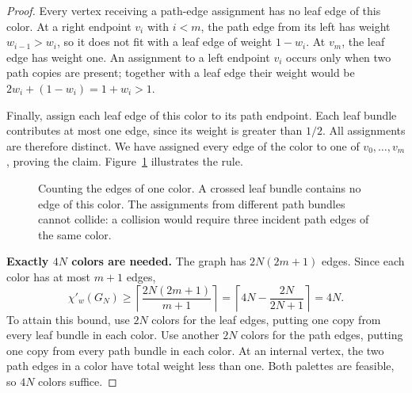 \documentclass[11pt]{article}
\theoremstyle{definition}\newtheorem{algorithm}{Algorithm}[section]
\numberwithin{equation}{section}
\theoremstyle{remark}\newtheorem*{remark}{Remark}
\begin{document}
\begin{proof}
Every vertex receiving a path-edge assignment has no leaf edge of this
color. At a right endpoint $v_i$ with $i<m$, the path edge from its
left has weight $w_{i-1}>w_i$, so it does not fit with a leaf edge of
weight $1-w_i$. At $v_m$, the leaf edge has weight one. An assignment
to a left endpoint $v_i$ occurs only when two path copies are present;
together with a leaf edge their weight would be
$2w_i+(1-w_i)=1+w_i>1$.

Finally, assign each leaf edge of this color to its path endpoint.
Each leaf bundle contributes at most one edge, since its weight is
greater than $1/2$. All assignments are therefore distinct. We have
assigned every edge of the color to one of $v_0,\ldots,v_m$, proving
the claim. Figure~\ref{fig:bp-four-thirds-count} illustrates the rule.

\begin{figure}[htbp]
\centering
{}
\caption{Counting the edges of one color. A crossed leaf bundle
contains no edge of this color. The assignments from different path
bundles cannot collide: a collision would require three incident
path edges of the same color.}
\label{fig:bp-four-thirds-count}
\end{figure}

\textbf{Exactly $4N$ colors are needed.}
The graph has $2N(2m+1)$ edges. Since each color has at most $m+1$ edges,
\[
 \chi'_w(G_N)\ge
 \left\lceil\frac{2N(2m+1)}{m+1}\right\rceil
 =\left\lceil4N-\frac{2N}{2N+1}\right\rceil=4N.
\]
To attain this bound, use $2N$ colors for the leaf edges, putting one
copy from every leaf bundle in each color. Use another $2N$ colors for
the path edges, putting one copy from every path bundle in each color.
At an internal vertex, the two path edges in a color have total weight
less than one. Both palettes are feasible, so $4N$ colors suffice.
\end{proof}
\end{document}
